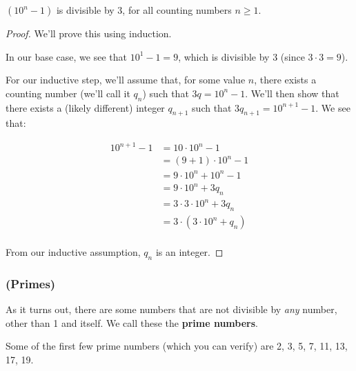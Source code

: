 \begin{theorem}
\label{th:div3-10n-1}
$(10^n - 1)$ is divisible by 3, for all counting numbers $n \geq 1$. 
\end{theorem}
\begin{proof}
We'll prove this using induction. 

In our base case, we see that $10^1 - 1 = 9$, which is divisible by 3 (since $3 \cdot 3 = 9$). 

For our inductive step, we'll assume that, for some value $n$, there exists a counting number (we'll call it $q_n$) such that $3q = 10^n - 1$. We'll then show that there exists a (likely different) integer $q_{n+1}$ such that $3q_{n+1} = 10^{n+1} - 1$. We see that:

\begin{align*}
10^{n+1} - 1 &= 10 \cdot 10^n - 1 \\
&= (9 + 1) \cdot 10^n - 1 \\
&= 9 \cdot 10^n + 10^n - 1 \\
&= 9 \cdot 10^n + 3q_n \\
&= 3 \cdot 3 \cdot 10^n + 3q_n \\
&= 3 \cdot (3 \cdot 10^n + q_n) \\
\end{align*}

From our inductive assumption, $q_n$ is an integer. 

\end{proof}

\subsubsection{(Primes)}

As it turns out, there are some numbers that are not divisible by \emph{any} number, other than 1 and itself. We call these the \textbf{prime numbers}. 

Some of the first few prime numbers (which you can verify) are 2, 3, 5, 7, 11, 13, 17, 19. %


